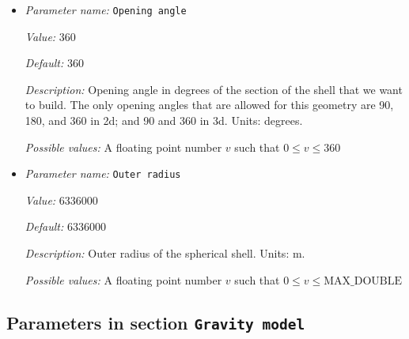 \begin{itemize}
{\it Possible values:} A floating point number $v$ such that $0 \leq v \leq \text{MAX\_DOUBLE}$
\item {\it Parameter name:} {\tt Opening angle}
\label{parameters:Geometry model/Spherical shell/Opening angle}


{\it Value:} 360


{\it Default:} 360


{\it Description:} Opening angle in degrees of the section of the shell that we want to build. The only opening angles that are allowed for this geometry are 90, 180, and 360 in 2d; and 90 and 360 in 3d. Units: degrees.


{\it Possible values:} A floating point number $v$ such that $0 \leq v \leq 360$
\item {\it Parameter name:} {\tt Outer radius}
\label{parameters:Geometry model/Spherical shell/Outer radius}


{\it Value:} 6336000


{\it Default:} 6336000


{\it Description:} Outer radius of the spherical shell. Units: m. 



{\it Possible values:} A floating point number $v$ such that $0 \leq v \leq \text{MAX\_DOUBLE}$
\end{itemize}

\subsection{Parameters in section \tt Gravity model}
\label{parameters:Gravity_20model}

